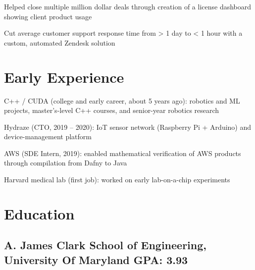 \documentclass[print]{jack-resume}
\begin{document}
\begin{tightemize}
    \item Helped close multiple million dollar deals through creation of a license dashboard showing client product usage
    \item Cut average customer support response time from > 1 day to < 1 hour with a custom, automated Zendesk solution
\end{tightemize}
\sectionsep

\section{Early Experience}
\vspace{1.4em}
\begin{tightemize}
    \item C++ / CUDA (college and early career, about 5 years ago): robotics and ML projects, master's-level C++ courses, and senior-year robotics research
    \item Hydraze (CTO, 2019 -- 2020): IoT sensor network (Raspberry Pi + Arduino) and device-management platform
    \item AWS (SDE Intern, 2019): enabled mathematical verification of AWS products through compilation from Dafny to Java
    \item Harvard medical lab (first job): worked on early lab-on-a-chip experiments
\end{tightemize}
\sectionsep

\section{Education}
\subsection{A. James Clark School of Engineering, University Of Maryland \hfill GPA: 3.93}

\begin{minipage}[t]{0.04\textwidth}
    \hfill
\end{minipage}
\end{document}

